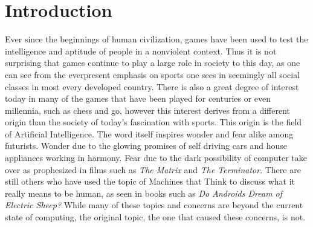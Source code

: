 \documentclass[10pt, a4paper, twocolumn]{article} %
\newcommand*\Hs[1]{\ensuremath{{\color{blue} #1}{\color{red}\varheartsuit}}}
\newcommand*\Cs[1]{\ensuremath{{\color{blue} #1}{\color{black}\clubsuit}}}
\begin{document}


\section{Introduction}

Ever since the beginnings of human civilization, games have been used to test the intelligence and aptitude of people in a nonviolent context. Thus it is not surprising that games continue to play a large role in society to this day, as one can see from the everpresent emphasis on sports one sees in seemingly all social classes in most every developed country. There is also a great degree of interest today in many of the games that have been played for centuries or even millennia, such as chess and go, however this interest derives from a different origin than the society of today's fascination with sports. This origin is the field of Artificial Intelligence. The word itself inspires wonder and fear alike among futurists. Wonder due to the glowing promises of self driving cars and house appliances working in harmony. Fear due to the dark possibility of computer take over as prophesized in films such as \textit{The Matrix} and \textit{The Terminator}. There are still others who have used the topic of Machines that Think to discuss what it really means to be human, as seen in books such as \textit{Do Androids Dream of Electric Sheep?} While many of these topics and concerns are beyond the current state of computing, the original topic, the one that caused these concerns, is not.
\end{document}

